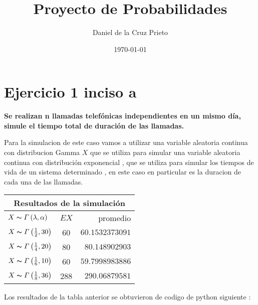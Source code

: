 \documentclass{article}
\begin{document}
    \title{Proyecto de Probabilidades} 
	\author{Daniel de la Cruz Prieto}
	\date{\today}    
    \maketitle
    
    \section*{Ejercicio 1 inciso a}

    \begin{flushleft}
        {\bf Se realizan n llamadas telef\'onicas independientes en un mismo d\'ia, simule
        el tiempo total de duraci\'on de las llamadas.}

        Para la simulacion de este caso vamos a utilizar una variable aleatoria continua con 
        distribucion Gamma $X  $ que se utiliza para simular una variable aleatoria continua con 
        distribuci\'on exponencial , que se utiliza para simular los tiempos de vida de un 
        sistema determinado , en este caso en particular es la duracion de cada una de las llamadas. 

        \begin{center}
            \begin{tabular}{|l|c|r|}
                \hline
                \multicolumn{3}{|c|}{Resultados de la simulaci\'on}\\
                \hline
                \hline
                $X \thicksim \varGamma \left(\lambda , \alpha\right) $ & $EX$ & promedio \\
                \hline
                $X \thicksim \varGamma \left(\frac{1}{2} , 30\right) $ & 60& $60.1532373091$  \\
                \hline 
                $X \thicksim \varGamma \left(\frac{1}{4} , 20\right) $ & 80& $80.148902903$  \\
                \hline
                $X \thicksim \varGamma \left(\frac{1}{6} , 10\right) $ & 60& $59.7998983886$ \\
                \hline
                $X \thicksim \varGamma \left(\frac{1}{8} , 36\right) $ & 288 & $290.06879581$  \\
                \hline
            \end{tabular}
        \end{center}

        Los resultados de la tabla anterior se obtuvieron de codigo de python siguiente : 


\end{flushleft}
\end{document}
